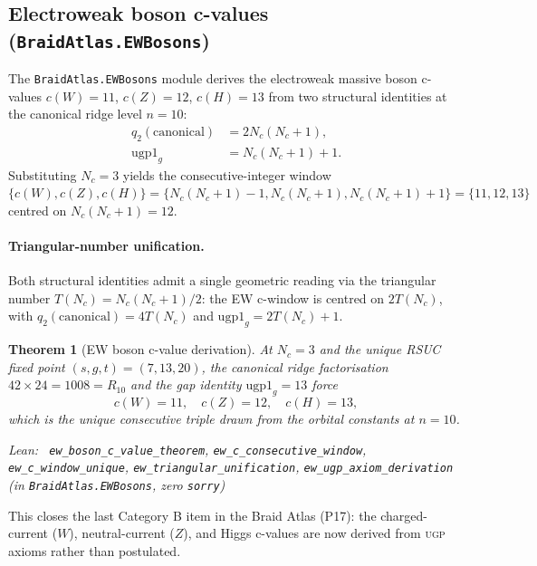 \documentclass[11pt,a4paper]{article}
\newenvironment{leanref}%
  {\par\smallskip\noindent\begingroup\raggedright\textup{Lean:}~}%
  {\par\endgroup}
\newtheorem{theorem}{Theorem}[section]
\theoremstyle{definition}
\newcommand{\ugp}{\textsc{ugp}}
\begin{document}
\subsection{Electroweak boson c-values (\texttt{BraidAtlas.EWBosons})}
\label{sec:ewbosons_lean}

The \texttt{BraidAtlas.EWBosons} module derives the electroweak massive
boson c-values $c(W)=11$, $c(Z)=12$, $c(H)=13$ from two structural
identities at the canonical ridge level $n = 10$:
\begin{align*}
  q_2(\text{canonical}) &= 2N_c(N_c+1), \\
  \mathrm{ugp1}_g       &= N_c(N_c+1) + 1.
\end{align*}
Substituting $N_c = 3$ yields the consecutive-integer window
$\{c(W), c(Z), c(H)\} = \{N_c(N_c+1)-1, N_c(N_c+1), N_c(N_c+1)+1\}
= \{11, 12, 13\}$ centred on $N_c(N_c+1)=12$.

\paragraph{Triangular-number unification.}
Both structural identities admit a single geometric reading via the
triangular number $T(N_c) = N_c(N_c+1)/2$: the EW c-window is centred
on $2T(N_c)$, with $q_2(\text{canonical}) = 4T(N_c)$ and
$\mathrm{ugp1}_g = 2T(N_c) + 1$.

\begin{theorem}[EW boson c-value derivation]
\label{thm:ewbosons}
At $N_c = 3$ and the unique RSUC fixed point $(s, g, t) = (7, 13, 20)$,
the canonical ridge factorisation $42 \times 24 = 1008 = R_{10}$ and
the gap identity $\mathrm{ugp1}_g = 13$ force
\[
  c(W) = 11, \quad c(Z) = 12, \quad c(H) = 13,
\]
which is the unique consecutive triple drawn from the orbital constants
at $n = 10$.
\begin{leanref}
\lstinline|ew_boson_c_value_theorem|,
\lstinline|ew_c_consecutive_window|,
\lstinline|ew_c_window_unique|,
\lstinline|ew_triangular_unification|,
\lstinline|ew_ugp_axiom_derivation|
\textup{(in \texttt{BraidAtlas.EWBosons}, zero \texttt{sorry})}
\end{leanref}
\end{theorem}

This closes the last Category B item in the Braid Atlas (P17): the
charged-current ($W$), neutral-current ($Z$), and Higgs c-values are
now derived from \ugp{} axioms rather than postulated.
\end{document}
